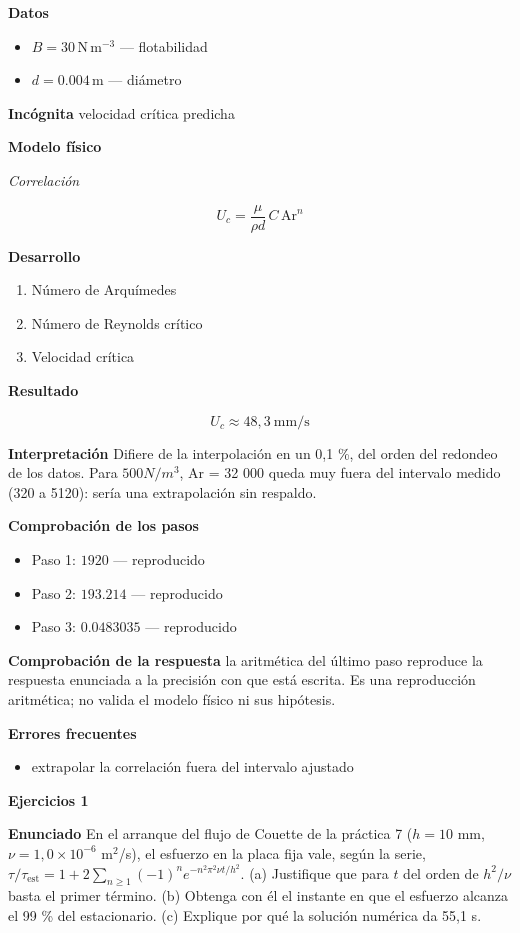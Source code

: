 \documentclass[10pt,openany]{book}
\begin{document}
\noindent\textbf{Datos}
\begin{itemize}
\item $B = 30\,\mathrm{N}\,\mathrm{m}^{-3}$ — flotabilidad
\item $d = 0.004\,\mathrm{m}$ — diámetro
\end{itemize}

\noindent\textbf{Incógnita}
velocidad crítica predicha

\noindent\textbf{Modelo físico}

\noindent\textit{Correlación}

\[
U_c = \frac{\mu}{\rho d}\,C\,\mathrm{Ar}^{n}
\]

\noindent\textbf{Desarrollo}
\begin{enumerate}
\item
Número de Arquímedes
\item
Número de Reynolds crítico
\item
Velocidad crítica
\end{enumerate}

\noindent\textbf{Resultado}

\[
U_c \approx 48{,}3\ \mathrm{mm/s}
\]

\noindent\textbf{Interpretación}
Difiere de la interpolación en un 0,1 \%, del orden del redondeo de los datos. Para \(500 N/m^3\), Ar = 32 000 queda muy fuera del intervalo medido (320 a 5120): sería una extrapolación sin respaldo.

\noindent\textbf{Comprobación de los pasos}
\begin{itemize}
\item Paso 1: $1920$ — reproducido
\item Paso 2: $193.214$ — reproducido
\item Paso 3: $0.0483035$ — reproducido
\end{itemize}

\noindent\textbf{Comprobación de la respuesta} la aritmética del último paso reproduce la respuesta enunciada a la precisión con que está escrita. Es una reproducción aritmética; no valida el modelo físico ni sus hipótesis.

\noindent\textbf{Errores frecuentes}
\begin{itemize}
\item extrapolar la correlación fuera del intervalo ajustado
\end{itemize}

\noindent\textbf{Ejercicios 1}

\noindent\textbf{Enunciado}
En el arranque del flujo de Couette de la práctica 7 (\(h = 10\) mm, \(\nu = 1{,}0\times 10^{-6}\) m\(^2\)/s), el esfuerzo en la placa fija vale, según la serie, \(\tau/\tau_{\mathrm{est}} = 1 + 2\sum_{n\ge 1}(-1)^{n}e^{-n^{2}\pi^{2}\nu t/h^{2}}\). (a) Justifique que para \(t\) del orden de \(h^{2}/\nu\) basta el primer término. (b) Obtenga con él el instante en que el esfuerzo alcanza el 99 \% del estacionario. (c) Explique por qué la solución numérica da 55,1 s.
\end{document}
